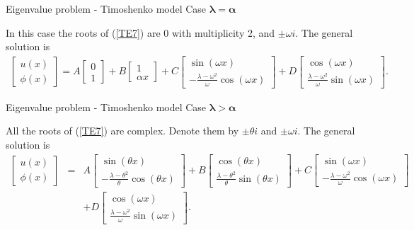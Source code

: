 \documentclass{beamer}
\begin{document}
\begin{frame}{Eigenvalue problem - Timoshenko model}
    Case $\boldsymbol{ \lambda=\alpha}$

    In this case the roots of (\ref{TE7}) are $0$ with multiplicity 2, and $\pm \omega i$. The general solution is
    \begin{eqnarray*}
        \begin{bmatrix}
            u(x)\\ \phi(x)
        \end{bmatrix}
        =
        A
        \begin{bmatrix}
            0 \\1
        \end{bmatrix}
        +
        B
        \begin{bmatrix}
            1 \\ \alpha x
        \end{bmatrix}
        +
        C
        \begin{bmatrix}
            \sin (\omega x) \\ -\frac{\lambda-\omega^{2}}{\omega}\cos (\omega x)
        \end{bmatrix}
        +
        D
        \begin{bmatrix}
            \cos (\omega x) \\ \frac{\lambda-\omega^{2}}{\omega}\sin (\omega x)
        \end{bmatrix}.\label{T9}
    \end{eqnarray*}
\end{frame}

\begin{frame}{Eigenvalue problem - Timoshenko model}
    Case $\boldsymbol{\lambda>\alpha}$

    All the roots of (\ref{TE7}) are complex. Denote them by $\pm \theta i$ and $\pm \omega i$. The general solution is
    \begin{eqnarray*}
    \begin{bmatrix}
    u(x)\\ \phi(x)
    \end{bmatrix}
    &=&
    A
    \begin{bmatrix}
    \sin (\theta  x) \\-\frac{\lambda-\theta^{2}}{\theta}\cos (\theta x)
    \end{bmatrix}
    +
    B
    \begin{bmatrix}
    \cos (\theta x) \\ \frac{\lambda-\theta^{2}}{\theta}\sin (\theta x)
    \end{bmatrix}
    +
    C
    \begin{bmatrix}
    \sin (\omega x) \\ -\frac{\lambda-\omega^{2}}{\omega}\cos (\omega x)
    \end{bmatrix}\\
    &&
    +
    D
    \begin{bmatrix}
    \cos (\omega x) \\ \frac{\lambda-\omega^{2}}{\omega}\sin (\omega x)
    \end{bmatrix}.\label{T10}
    \end{eqnarray*}
\end{frame}
\end{document}
